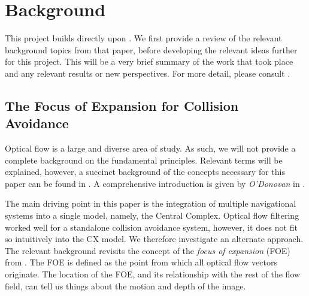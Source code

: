 \documentclass[a4paper,11pt,twoside,openright]{article}
\let\oldsection\section
\def\section{\cleardoublepage\oldsection}
\begin{document}
\section{ Background }
This project builds directly upon \cite{Mitchell2018}. We first provide a review
of the relevant background topics from that paper, before developing the relevant
ideas further for this project. This will be a very brief summary of the work
that took place and any relevant results or new perspectives. For more detail,
please consult \cite{Mitchell2018}.


\subsection{ The Focus of Expansion for Collision Avoidance } \label{OFBackground}
Optical flow is a large and diverse area of study. As such, we will
not provide a complete background on the fundamental
principles. Relevant terms will be explained, however, a succinct
background of the concepts necessary for this paper can be found in
\cite{Mitchell2018}. A comprehensive introduction is given by
\textit{O'Donovan} in \cite{ODonovan2005}.
\newline
\par

The main driving point in this paper is the integration of multiple
navigational systems into a single model, namely, the Central Complex.
Optical flow filtering worked well for a standalone collision
avoidance system, however, it does not fit so intuitively into the CX
model. We therefore investigate an alternate approach. The relevant
background revisits the concept of the \textit{focus of expansion}
(FOE) from \cite{Mitchell2018, ODonovan2005}.  The FOE is defined as
the point from which all optical flow vectors originate. The location
of the FOE, and its relationship with the rest of the flow field, can
tell us things about the motion and depth of the image.
\newline
\par
\end{document}

